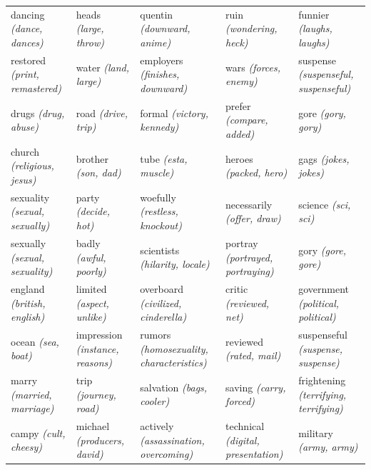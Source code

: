{\begin{landscape}
\begin{table}[]
\begin{tabular}{lllll}
			dancing \textit{(dance, dances)}           & heads \textit{(large, throw)}             & quentin \textit{(downward, anime)}               & ruin \textit{(wondering, heck)}             & funnier \textit{(laughs, laughs)}             \\
			restored \textit{(print, remastered)}      & water \textit{(land, large)}              & employers \textit{(finishes, downward)}          & wars \textit{(forces, enemy)}               & suspense \textit{(suspenseful, suspenseful)}  \\
			drugs \textit{(drug, abuse)}               & road \textit{(drive, trip)}               & formal \textit{(victory, kennedy)}               & prefer \textit{(compare, added)}            & gore \textit{(gory, gory)}                    \\
			church \textit{(religious, jesus)}         & brother \textit{(son, dad)}               & tube \textit{(esta, muscle)}                     & heroes \textit{(packed, hero)}              & gags \textit{(jokes, jokes)}                  \\
			sexuality \textit{(sexual, sexually)}      & party \textit{(decide, hot)}              & woefully \textit{(restless, knockout)}           & necessarily \textit{(offer, draw)}          & science \textit{(sci, sci)}                   \\
			sexually \textit{(sexual, sexuality)}      & badly \textit{(awful, poorly)}            & scientists \textit{(hilarity, locale)}           & portray \textit{(portrayed, portraying)}    & gory \textit{(gore, gore)}                    \\
			england \textit{(british, english)}        & limited \textit{(aspect, unlike)}         & overboard \textit{(civilized, cinderella)}       & critic \textit{(reviewed, net)}             & government \textit{(political, political)}    \\
			ocean \textit{(sea, boat)}                 & impression \textit{(instance, reasons)}   & rumors \textit{(homosexuality, characteristics)} & reviewed \textit{(rated, mail)}             & suspenseful \textit{(suspense, suspense)}     \\
			marry \textit{(married, marriage)}         & trip \textit{(journey, road)}             & salvation \textit{(bags, cooler)}                & saving \textit{(carry, forced)}             & frightening \textit{(terrifying, terrifying)} \\
			campy \textit{(cult, cheesy)}              & michael \textit{(producers, david)}       & actively \textit{(assassination, overcoming)}    & technical \textit{(digital, presentation)}  & military \textit{(army, army)}                \\

\end{tabular}
\end{table}
\end{landscape}}

